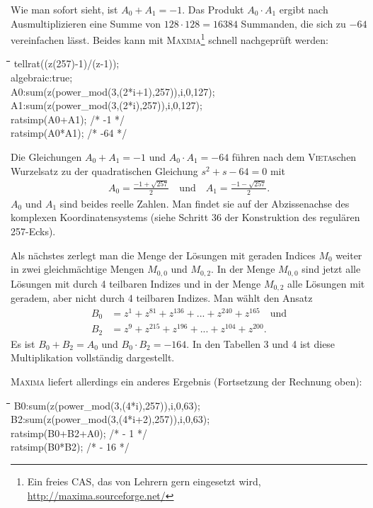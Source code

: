 \documentclass[11pt]{article}
\def\pw{{\char94}}
\newenvironment{code}{\tt \begin{tabbing}
\hskip12pt\=\hskip12pt\=\hskip12pt\=\hskip12pt\=\hskip5cm\=\hskip5cm\=\kill}
{\end{tabbing}}
\begin{document}
Wie man sofort sieht, ist $A_0 + A_1 = -1$. Das Produkt $A_0 \cdot A_1$ ergibt
nach Ausmultiplizieren eine Summe von $128 \cdot 128 = 16384$ Summanden, die
sich zu $-64$ vereinfachen lässt. Beides kann mit \textsc{Maxima}\footnote{Ein
  freies CAS, das von Lehrern gern eingesetzt wird,
  \url{http://maxima.sourceforge.net/}} schnell nachgeprüft werden:
\begin{code}
tellrat((z\pw(257)-1)/(z-1));\\
algebraic:true;\\
A0:sum(z\pw(power\_mod(3,(2*i+1),257)),i,0,127);\\
A1:sum(z\pw(power\_mod(3,(2*i),257)),i,0,127);\\
ratsimp(A0+A1); /*  -1 */\\
ratsimp(A0*A1); /* -64 */
\end{code}

Die Gleichungen $A_0 + A_1 = -1$ und $A_0 \cdot A_1 = -64$ führen nach dem
\textsc{Vieta}schen Wurzelsatz zu der quadratischen Gleichung $s^2 + s - 64 =
0$ mit 
\begin{gather*}
  A_0=\frac{-1+\sqrt{257}}{2}\quad\text{und}\quad A_1=\frac{-1-\sqrt{257}}{2}.
\end{gather*}
$A_0$ und $A_1$ sind beides reelle Zahlen. Man findet sie auf der
Abzissenachse des komplexen Koordinatensystems (siehe Schritt 36 der
Konstruktion des regulären 257-Ecks).

Als nächstes zerlegt man die Menge der Lösungen mit geraden Indices $M_{0}$
weiter in zwei gleichmächtige Mengen $M_{0,0}$ und $M_{0,2}$. In der Menge
$M_{0,0}$ sind jetzt alle Lösungen mit durch 4 teilbaren Indizes und in der
Menge $M_{0,2}$ alle Lösungen mit geradem, aber nicht durch 4 teilbaren
Indizes.  Man wählt den Ansatz 
\begin{align*}
  B_0 &= z^1 + z^{81} + z^{136} + ... + z^{240} + z^{165}\quad\text{und}\\ B_2
  &= z^9 + z^{215} + z^{196} + ... + z^{104} + z^{200}.
\end{align*}
Es ist $B_0 + B_2 = A_0$ und $B_0 \cdot B_2 = -164$. In den Tabellen 3 und 4
ist diese Multiplikation vollständig dargestellt.

\textsc{Maxima} liefert allerdings ein anderes Ergebnis (Fortsetzung der
Rechnung oben): 
\begin{code}
B0:sum(z\pw(power\_mod(3,(4*i),257)),i,0,63);\\
B2:sum(z\pw(power\_mod(3,(4*i+2),257)),i,0,63);\\
ratsimp(B0+B2+A0); /*  - 1 */\\
ratsimp(B0*B2);  /* - 16 */
\end{code}
\end{document}
